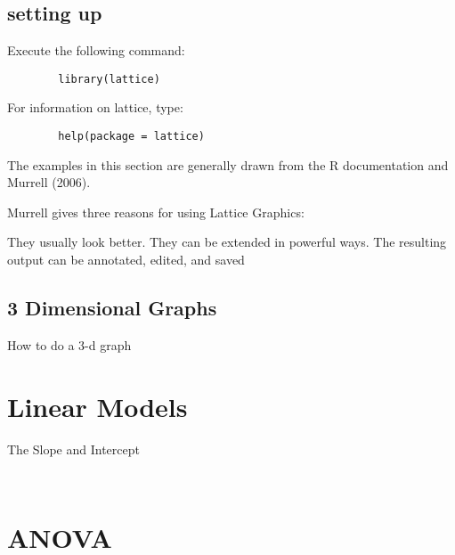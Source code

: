 \documentclass[a4paper,12pt]{article}
\begin{document}
	\subsection{setting up}
	Execute the following command:
	\begin{framed}
		\begin{verbatim}
		library(lattice)
		\end{verbatim}
	\end{framed}
	For information on lattice, type:
	\begin{framed}
		\begin{verbatim}
		help(package = lattice)
		\end{verbatim}
	\end{framed}
	The examples in this section are generally drawn from the R documentation and Murrell (2006).
	
	Murrell gives three reasons for using Lattice Graphics:
	
	They usually look better.
	They can be extended in powerful ways.
	The resulting output can be annotated, edited, and saved
	
	\subsection{3 Dimensional Graphs}
	How to do a 3-d graph
	
	\newpage
	
	\section{Linear Models}
	
	The Slope and Intercept
	\begin{framed}
		\begin{verbatim}
		
		\end{verbatim}
	\end{framed}
	
	\section{ANOVA}
	
\end{document}
